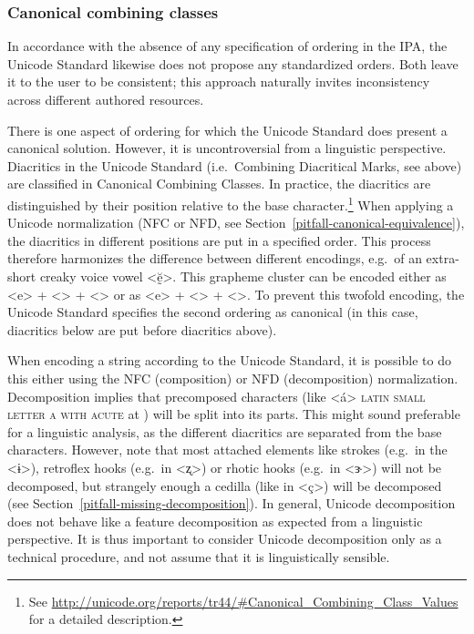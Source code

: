 \subsubsection*{Canonical combining classes}

In accordance with the absence of any specification of ordering in the IPA, the
Unicode Standard likewise does not propose any standardized orders. Both leave it
to the user to be consistent; this approach naturally invites inconsistency across 
different authored resources.

There is one aspect of ordering for which the Unicode Standard does present a
canonical solution. However, it is uncontroversial from a linguistic
perspective. Diacritics in the Unicode Standard (i.e.~Combining Diacritical
Marks, see above) are classified in Canonical Combining Classes. In practice,
the diacritics are distinguished by their position relative to the base
character.\footnote{See
\url{http://unicode.org/reports/tr44/\#Canonical\_Combining\_Class\_Values} for
a detailed description.} When applying a Unicode normalization (NFC or NFD, see
Section~\ref{pitfall-canonical-equivalence}), the diacritics in different
positions are put in a specified order. This process therefore harmonizes the
difference between different encodings, e.g.\ of an extra-short creaky voice vowel
<ḛ̆>. This grapheme cluster can be encoded either as <e> + <> +
<> or as <e> + <> + <>. To prevent this twofold encoding,
the Unicode Standard specifies the second ordering as canonical (in this case,
diacritics below are put before diacritics above).

When encoding a string according to the Unicode Standard, it is possible to do
this either using the NFC (composition) or NFD (decomposition) normalization.
Decomposition implies that precomposed characters (like <á> \textsc{latin small
letter a with acute} at ) will be split into its parts. This might
sound preferable for a linguistic analysis, as the different diacritics are
separated from the base characters. However, note that most attached elements
like strokes (e.g.~in the <ɨ>), retroflex hooks (e.g.~in <ʐ>) or rhotic hooks
(e.g.~in <ɝ>) will not be decomposed, but strangely enough a cedilla (like in
<ç>) will be decomposed (see Section~\ref{pitfall-missing-decomposition}). In
general, Unicode decomposition does not behave like a feature decomposition as
expected from a linguistic perspective. It is thus important to consider Unicode
decomposition only as a technical procedure, and not assume that it is
linguistically sensible.

